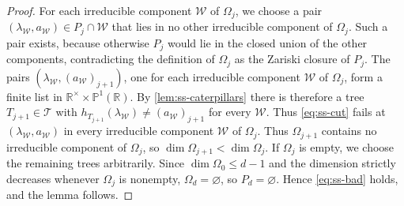 \documentclass[10pt,a4paper]{article}
\theoremstyle{plain}
\theoremstyle{definition}
\newcommand{\R}{\mathbb{R}}
\begin{document}
\begin{proof}
For each irreducible component $\mathcal W$ of $\Omega_j$, we choose a pair
$(\lambda_{\mathcal W},a_{\mathcal W})\in P_j\cap\mathcal W$ that lies in no other irreducible component
of $\Omega_j$.
Such a pair exists, because otherwise $P_j$ would lie in the closed
union of the other components, contradicting the definition of
$\Omega_j$ as the Zariski closure of $P_j$.
The pairs $(\lambda_{\mathcal W},(a_{\mathcal W})_{j+1})$, one for each irreducible component
$\mathcal W$ of $\Omega_j$, form a finite list in
$\R^\times\times\mathbb P^1(\R)$.
By \cref{lem:ss-caterpillars} there is therefore a tree
$T_{j+1}\in\mathcal T$ with
$h_{T_{j+1}}(\lambda_{\mathcal W})\ne(a_{\mathcal W})_{j+1}$ for every $\mathcal W$.
Thus \cref{eq:ss-cut} fails at $(\lambda_{\mathcal W},a_{\mathcal W})$ in every irreducible
component $\mathcal W$ of $\Omega_j$.
Thus $\Omega_{j+1}$ contains no irreducible component of $\Omega_j$,
so $\dim\Omega_{j+1}<\dim\Omega_j$.
If $\Omega_j$ is empty, we choose the remaining trees arbitrarily.
Since $\dim\Omega_0\le d-1$ and the dimension strictly decreases
whenever $\Omega_j$ is nonempty, $\Omega_d=\varnothing$, so $P_d=\varnothing$.
Hence \cref{eq:ss-bad} holds, and the lemma follows.
\end{proof}
\end{document}
